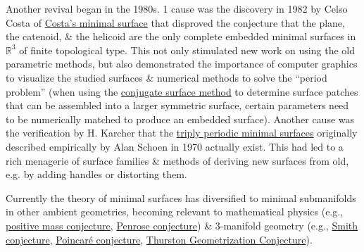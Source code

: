 \documentclass{article}
\begin{document}
Another revival began in the 1980s. 1 cause was the discovery in 1982 by {\sc Celso Costa} of \href{https://en.wikipedia.org/wiki/Costa%27s_minimal_surface}{Costa's minimal surface} that disproved the conjecture that the plane, the catenoid, \& the helicoid are the only complete embedded minimal surfaces in $\mathbb{R}^3$ of finite topological type. This not only stimulated new work on using the old parametric methods, but also demonstrated the importance of computer graphics to visualize the studied surfaces \& numerical methods to solve the ``period problem'' (when using the \href{https://en.wikipedia.org/wiki/Associate_family}{conjugate surface method} to determine surface patches that can be assembled into a larger symmetric surface, certain parameters need to be numerically matched to produce an embedded surface). Another cause was the verification by {\sc H. Karcher} that the \href{https://en.wikipedia.org/wiki/Triply_periodic_minimal_surface}{triply periodic minimal surfaces} originally described empirically by {\sc Alan Schoen} in 1970 actually exist. This had led to a rich menagerie of surface families \& methods of deriving new surfaces from old, e.g. by adding handles or distorting them.

Currently the theory of minimal surfaces has diversified to minimal submanifolds in other ambient geometries, becoming relevant to mathematical physics (e.g., \href{https://en.wikipedia.org/wiki/Positive_mass_conjecture}{positive mass conjecture}, \href{https://en.wikipedia.org/wiki/Riemannian_Penrose_inequality}{Penrose conjecture}) \& 3-manifold geometry (e.g., \href{https://en.wikipedia.org/wiki/Smith_conjecture}{Smith conjecture}, \href{https://en.wikipedia.org/wiki/Poincar%C3%A9_conjecture}{Poincar\'e conjecture}, \href{https://en.wikipedia.org/wiki/Thurston_Geometrization_Conjecture}{Thurston Geometrization Conjecture}).
\end{document}
